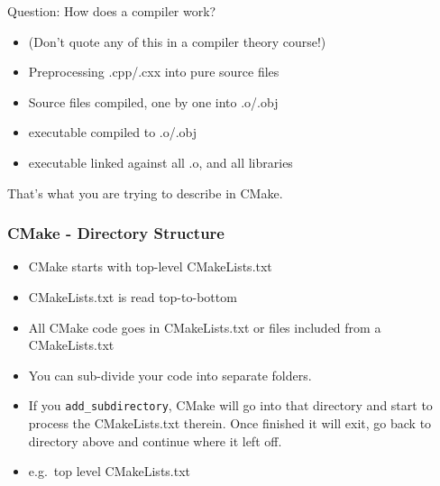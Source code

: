 Question: How does a compiler work?

\begin{itemize}
\tightlist
\item
  (Don't quote any of this in a compiler theory course!)
\item
  Preprocessing .cpp/.cxx into pure source files
\item
  Source files compiled, one by one into .o/.obj
\item
  executable compiled to .o/.obj
\item
  executable linked against all .o, and all libraries
\end{itemize}

That's what you are trying to describe in CMake.

\hypertarget{cmake---directory-structure}{%
\subsubsection{CMake - Directory
Structure}\label{cmake---directory-structure}}

\begin{itemize}
\tightlist
\item
  CMake starts with top-level CMakeLists.txt
\item
  CMakeLists.txt is read top-to-bottom
\item
  All CMake code goes in CMakeLists.txt or files included from a
  CMakeLists.txt
\item
  You can sub-divide your code into separate folders.
\item
  If you \texttt{add\_subdirectory}, CMake will go into that directory
  and start to process the CMakeLists.txt therein. Once finished it will
  exit, go back to directory above and continue where it left off.
\item
  e.g.~top level CMakeLists.txt
\end{itemize}

\begin{Shaded}
\begin{Highlighting}[]
\NormalTok{(}\NormalTok{)}
  \NormalTok{()}
\NormalTok{()}
\end{Highlighting}
\end{Shaded}

